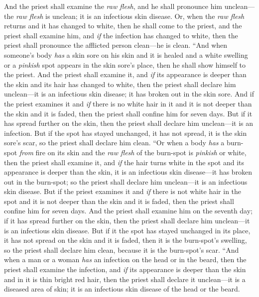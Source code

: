 \begin{biblechapter}
\verse And the priest shall examine the \textit{raw flesh}, and he shall pronounce him unclean—the \textit{raw flesh} is unclean; it is an infectious skin disease.
\verse Or, when the \textit{raw flesh} returns and it has changed to white, then he shall come to the priest,
\verse and the priest shall examine him, and \textit{if} the infection has changed to white, then the priest shall pronounce the afflicted person clean—he is clean.
\verse “And when someone’s body \textit{has} a skin sore on his skin and it is healed
\verse and a white swelling or a \textit{pinkish} spot appears in the skin sore’s place, then he shall show himself to the priest.
\verse And the priest shall examine it, and \textit{if} its appearance is deeper than the skin and its hair has changed to white, then the priest shall declare him unclean—it is an infectious skin disease; it has broken out in the skin sore.
\verse And if the priest examines it and \textit{if} there is no white hair in it and it is not deeper than the skin and it is faded, then the priest shall confine him for seven days.
\verse But if it has spread further on the skin, then the priest shall declare him unclean—it is an infection.
\verse But if the spot has stayed unchanged, it has not spread, it is the skin sore’s scar, so the priest shall declare him clean.
\verse “Or when a body \textit{has} a burn-spot \textit{from} fire on its skin and the \textit{raw flesh} of the burn-spot is \textit{pinkish} or white,
\verse then the priest shall examine it, and \textit{if} the hair turns white in the spot and its appearance is deeper than the skin, it is an infectious skin disease—it has broken out in the burn-spot; so the priest shall declare him unclean—it is an infectious skin disease.
\verse But if the priest examines it and \textit{if} there is not white hair in the spot and it is not deeper than the skin and it is faded, then the priest shall confine him for seven days.
\verse And the priest shall examine him on the seventh day; if it has spread further on the skin, then the priest shall declare him unclean—it is an infectious skin disease.
\verse But if it the spot has stayed unchanged in its place, it has not spread on the skin and it is faded, then it is the burn-spot’s swelling, so the priest shall declare him clean, because it is the burn-spot’s scar.
\verse “And when a man or a woman \textit{has} an infection on the head or in the beard,
\verse then the priest shall examine the infection, and \textit{if} its appearance is deeper than the skin and in it is thin bright red hair, then the priest shall declare it unclean—it is a diseased area of skin; it is an infectious skin disease of the head or the beard.

\end{biblechapter}
